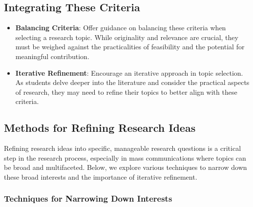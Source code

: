 \documentclass[
]{book}
\providecommand{\tightlist}{%
  \setlength{\itemsep}{0pt}\setlength{\parskip}{0pt}}
\begin{document}
\hypertarget{integrating-these-criteria}{%
\subsection*{Integrating These Criteria}\label{integrating-these-criteria}}

\begin{itemize}
\tightlist
\item
  \textbf{Balancing Criteria}: Offer guidance on balancing these criteria when selecting a research topic. While originality and relevance are crucial, they must be weighed against the practicalities of feasibility and the potential for meaningful contribution.
\item
  \textbf{Iterative Refinement}: Encourage an iterative approach in topic selection. As students delve deeper into the literature and consider the practical aspects of research, they may need to refine their topics to better align with these criteria.
\end{itemize}

\hypertarget{methods-for-refining-research-ideas}{%
\subsection*{Methods for Refining Research Ideas}\label{methods-for-refining-research-ideas}}

Refining research ideas into specific, manageable research questions is a critical step in the research process, especially in mass communications where topics can be broad and multifaceted. Below, we explore various techniques to narrow down these broad interests and the importance of iterative refinement.

\hypertarget{techniques-for-narrowing-down-interests}{%
\subsubsection*{Techniques for Narrowing Down Interests}\label{techniques-for-narrowing-down-interests}}
\end{document}
